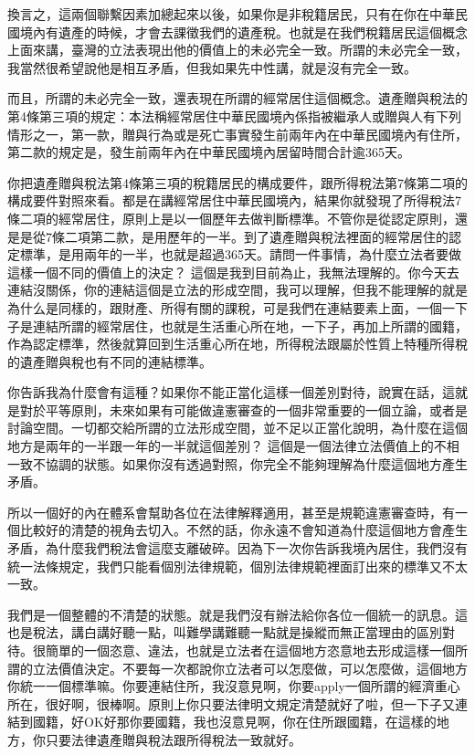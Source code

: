 \documentclass[]{ctexbook}
\begin{document}
換言之，這兩個聯繫因素加總起來以後，如果你是非稅籍居民，只有在你在中華民國境內有遺產的時候，才會去課徵我們的遺產稅。也就是在我們稅籍居民這個概念上面來講，臺灣的立法表現出他的價值上的未必完全一致。所謂的未必完全一致，我當然很希望說他是相互矛盾，但我如果先中性講，就是沒有完全一致。

而且，所謂的未必完全一致，還表現在所謂的經常居住這個概念。遺產贈與稅法的第4條第三項的規定：本法稱經常居住中華民國境內係指被繼承人或贈與人有下列情形之一，第一款，贈與行為或是死亡事實發生前兩年內在中華民國境內有住所，第二款的規定是，發生前兩年內在中華民國境內居留時間合計逾365天。

你把遺產贈與稅法第4條第三項的稅籍居民的構成要件，跟所得稅法第7條第二項的構成要件對照來看。都是在講經常居住中華民國境內，結果你就發現了所得稅法7條二項的經常居住，原則上是以一個歷年去做判斷標準。不管你是從認定原則，還是是從7條二項第二款，是用歷年的一半。到了遺產贈與稅法裡面的經常居住的認定標準，是用兩年的一半，也就是超過365天。請問一件事情，為什麼立法者要做這樣一個不同的價值上的決定？ 這個是我到目前為止，我無法理解的。你今天去連結沒關係，你的連結這個是立法的形成空間，我可以理解，但我不能理解的就是為什么是同樣的，跟財產、所得有關的課稅，可是我們在連結要素上面，一個一下子是連結所謂的經常居住，也就是生活重心所在地，一下子，再加上所謂的國籍，作為認定標準，然後就算回到生活重心所在地，所得稅法跟屬於性質上特種所得稅的遺產贈與稅也有不同的連結標準。

你告訴我為什麼會有這種？如果你不能正當化這樣一個差別對待，說實在話，這就是對於平等原則，未來如果有可能做違憲審查的一個非常重要的一個立論，或者是討論空間。一切都交給所謂的立法形成空間，並不足以正當化說明，為什麼在這個地方是兩年的一半跟一年的一半就這個差別？ 這個是一個法律立法價值上的不相一致不協調的狀態。如果你沒有透過對照，你完全不能夠理解為什麼這個地方產生矛盾。

所以一個好的內在體系會幫助各位在法律解釋適用，甚至是規範違憲審查時，有一個比較好的清楚的視角去切入。不然的話，你永遠不會知道為什麼這個地方會產生矛盾，為什麼我們稅法會這麼支離破碎。因為下一次你告訴我境內居住，我們沒有統一法條規定，我們只能看個別法律規範，個別法律規範裡面訂出來的標準又不太一致。

我們是一個整體的不清楚的狀態。就是我們沒有辦法給你各位一個統一的訊息。這也是稅法，講白講好聽一點，叫難學講難聽一點就是操縱而無正當理由的區別對待。很簡單的一個恣意、違法，也就是立法者在這個地方恣意地去形成這樣一個所謂的立法價值決定。不要每一次都說你立法者可以怎麼做，可以怎麼做，這個地方你統一一個標準嘛。你要連結住所，我沒意見啊，你要apply一個所謂的經濟重心所在，很好啊，很棒啊。原則上你只要法律明文規定清楚就好了啦，但一下子又連結到國籍，好OK好那你要國籍，我也沒意見啊，你在住所跟國籍，在這樣的地方，你只要法律遺產贈與稅法跟所得稅法一致就好。
\end{document}
